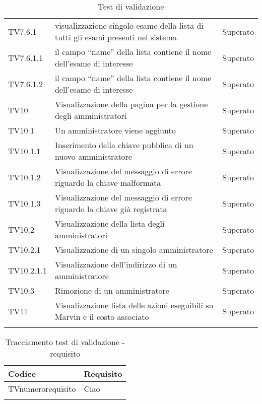\documentclass[PianoDiQualifica.tex]{subfiles}
\begin{document}
\begin{longtable}[H]{P{2cm}P{8.5cm}P{3cm}}
	TV7.6.1 & visualizzazione singolo esame della lista di tutti gli esami presenti nel sistema & Superato \\ 
	TV7.6.1.1 & il campo “name” della lista contiene il nome dell'esame di interesse & Superato \\ 
	TV7.6.1.2 & il campo “name” della lista contiene il nome dell'esame di interesse & Superato \\ 
	TV10 & Visualizzazione  della pagina per la gestione degli amministratori & Superato \\ 
	TV10.1 & Un amministratore viene aggiunto & Superato \\ 
	TV10.1.1 & Inserimento della chiave pubblica di un nuovo amministratore & Superato \\ 
	TV10.1.2 & Visualizzazione del messaggio di errore riguardo la chiave malformata & Superato \\ 
	TV10.1.3 & Visualizzazione del messaggio di errore riguardo la chiave già registrata & Superato \\ 
	TV10.2 & Visualizzazione della lista degli amministratori & Superato \\ 
	TV10.2.1 & Visualizzazione di un singolo amministratore & Superato \\ 
	TV10.2.1.1 & Visualizzazione dell'indirizzo di un amministratore & Superato \\ 
	TV10.3 & Rimozione di un amministratore & Superato \\ 
	TV11 & Visualizzazione lista delle azioni eseguibili su Marvin e il costo associato & Superato \\ 

	\hiderowcolors
	\caption{Test di validazione}
\end{longtable}

\begin{longtable}[H]{P{6.5cm}P{7cm}}
	\color{CHeaderText}\textbf{Codice} & 
	\color{CHeaderText}\textbf{Requisito} \\
	\endhead
	TVnumerorequisito & Ciao \\ 
	\hiderowcolors
	\caption{Tracciamento test di validazione - requisito}
\end{longtable}
\end{document}
